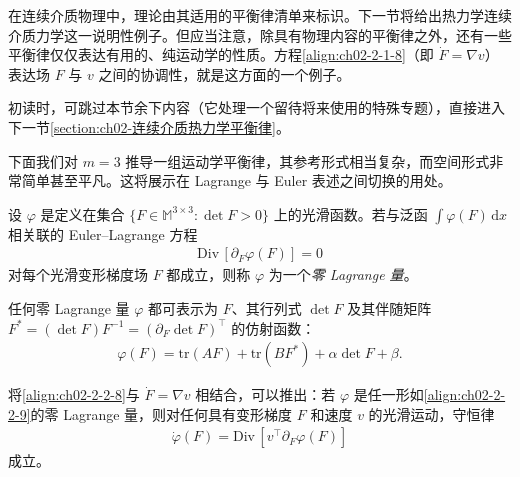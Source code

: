 ﻿\documentclass[../../main.tex]{subfiles}
\begin{document}
在连续介质物理中，理论由其适用的平衡律清单来标识。下一节将给出热力学连续介质力学这一说明性例子。但应当注意，除具有物理内容的平衡律之外，还有一些平衡律仅仅表达有用的、纯运动学的性质。方程\eqref{align:ch02-2-1-8}（即 $\dot{F}=\nabla v$）表达场 $F$ 与 $v$ 之间的协调性，就是这方面的一个例子。

初读时，可跳过本节余下内容（它处理一个留待将来使用的特殊专题），直接进入下一节\cref{section:ch02-连续介质热力学平衡律}。

下面我们对 $m=3$ 推导一组运动学平衡律，其参考形式相当复杂，而空间形式非常简单甚至平凡。这将展示在 Lagrange 与 Euler 表述之间切换的用处。

\begin{definition}[零 Lagrange 量]\label{definition:ch02-零Lagrange量}
设 $\varphi$ 是定义在集合 $\{F\in\mathbb{M}^{3\times 3}:\det F>0\}$ 上的光滑函数。若与泛函 $\int\varphi(F)\,\mathrm{d}x$ 相关联的 Euler--Lagrange 方程
\begin{align}
\mathrm{Div}\,[\partial_{F}\varphi(F)]=0
\label{align:ch02-2-2-8}
\end{align}
对每个光滑变形梯度场 $F$ 都成立，则称 $\varphi$ 为一个\emph{零 Lagrange 量}。
\end{definition}

任何零 Lagrange 量 $\varphi$ 都可表示为 $F$、其行列式 $\det F$ 及其伴随矩阵 $F^{*}=(\det F)F^{-1}=(\partial_{F}\det F)^{\top}$ 的仿射函数：
\begin{align}
\varphi(F)=\mathrm{tr}(AF)+\mathrm{tr}(BF^{*})+\alpha\det F+\beta.
\label{align:ch02-2-2-9}
\end{align}

将\eqref{align:ch02-2-2-8}与 $\dot{F}=\nabla v$ 相结合，可以推出：若 $\varphi$ 是任一形如\eqref{align:ch02-2-2-9}的零 Lagrange 量，则对任何具有变形梯度 $F$ 和速度 $v$ 的光滑运动，守恒律
\begin{align}
\dot{\varphi}(F)=\mathrm{Div}\,[v^{\top}\partial_{F}\varphi(F)]
\label{align:ch02-2-2-10}
\end{align}
成立。
\end{document}
